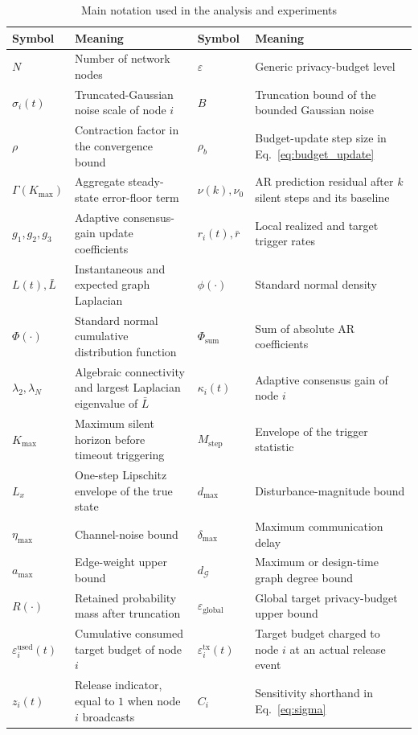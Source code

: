 \documentclass[10pt]{article}
\newcommand{\Lbar}{\bar{L}}
\newcommand{\dmax}{d_{\max}}
\newcommand{\amax}{a_{\max}}
\newcommand{\gdeg}{d_{\mathcal{G}}}
\newcommand{\egl}{\varepsilon_{\text{global}}}
\newcommand{\Mstep}{M_{\text{step}}}
\begin{document}
\begin{table}[t]
\centering
\footnotesize
\caption{Main notation used in the analysis and experiments}
\label{tab:notation}
\begin{tabularx}{\textwidth}{@{}lXlX@{}}
\toprule
Symbol & Meaning & Symbol & Meaning \\
\midrule
$N$ & Number of network nodes & $\varepsilon$ & Generic privacy-budget level \\
$\sigma_i(t)$ & Truncated-Gaussian noise scale of node $i$ & $B$ & Truncation bound of the bounded Gaussian noise \\
$\rho$ & Contraction factor in the convergence bound & $\rho_b$ & Budget-update step size in Eq.~\eqref{eq:budget_update} \\
$\Gamma(K_{\max})$ & Aggregate steady-state error-floor term & $\nu(k),\nu_0$ & AR prediction residual after $k$ silent steps and its baseline \\
$g_1,g_2,g_3$ & Adaptive consensus-gain update coefficients & $r_i(t),\bar r$ & Local realized and target trigger rates \\
$L(t),\Lbar$ & Instantaneous and expected graph Laplacian & $\phi(\cdot)$ & Standard normal density \\
$\Phi(\cdot)$ & Standard normal cumulative distribution function & $\Phi_{\mathrm{sum}}$ & Sum of absolute AR coefficients \\
$\lambda_2,\lambda_N$ & Algebraic connectivity and largest Laplacian eigenvalue of $\Lbar$ & $\kappa_i(t)$ & Adaptive consensus gain of node $i$ \\
$K_{\max}$ & Maximum silent horizon before timeout triggering & $\Mstep$ & Envelope of the trigger statistic \\
$L_x$ & One-step Lipschitz envelope of the true state & $\dmax$ & Disturbance-magnitude bound \\
$\eta_{\max}$ & Channel-noise bound & $\delta_{\max}$ & Maximum communication delay \\
$\amax$ & Edge-weight upper bound & $\gdeg$ & Maximum or design-time graph degree bound \\
$R(\cdot)$ & Retained probability mass after truncation & $\egl$ & Global target privacy-budget upper bound \\
$\varepsilon_i^{\mathrm{used}}(t)$ & Cumulative consumed target budget of node $i$ & $\varepsilon_i^{\mathrm{tx}}(t)$ & Target budget charged to node $i$ at an actual release event \\
$z_i(t)$ & Release indicator, equal to $1$ when node $i$ broadcasts & $C_i$ & Sensitivity shorthand in Eq.~\eqref{eq:sigma} \\
\bottomrule
\end{tabularx}
\end{table}
\end{document}
